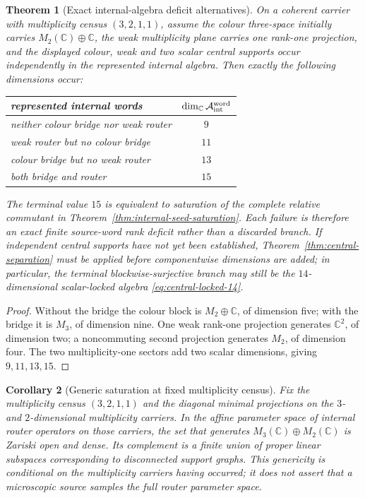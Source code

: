 \documentclass[11pt]{article}
\newtheorem{theorem}{Theorem}[section]
\newtheorem{corollary}[theorem]{Corollary}
\theoremstyle{definition}
\theoremstyle{remark}
\newcommand{\C}{\mathbb C}
\newcommand{\A}{\mathcal A}
\begin{document}
\begin{theorem}[Exact internal-algebra deficit alternatives]
\label{thm:internal-deficit-alternatives}
On a coherent carrier with multiplicity census $(3,2,1,1)$, assume the colour
three-space initially carries $M_2(\C)\oplus\C$, the weak multiplicity plane
carries one rank-one projection, and the displayed colour, weak and two scalar
central supports occur independently in the represented internal algebra.
Then exactly the following dimensions occur:
\begin{center}
\begin{tabular}{L{0.47\textwidth}c}
\toprule
represented internal words & $\dim_\C\A_{\rm int}^{\rm word}$\\\midrule
neither colour bridge nor weak router & $9$\\
weak router but no colour bridge & $11$\\
colour bridge but no weak router & $13$\\
both bridge and router & $15$\\
\bottomrule
\end{tabular}
\end{center}
The terminal value $15$ is equivalent to saturation of the complete relative
commutant in Theorem~\ref{thm:internal-seed-saturation}.  Each failure is
therefore an exact finite source-word rank deficit rather than a discarded
branch.  If independent central supports have not yet been established,
Theorem~\ref{thm:central-separation} must be applied before componentwise
dimensions are added; in particular, the terminal blockwise-surjective branch
may still be the $14$-dimensional scalar-locked algebra
\eqref{eq:central-locked-14}.
\end{theorem}

\begin{proof}
Without the bridge the colour block is $M_2\oplus\C$, of dimension five; with
the bridge it is $M_3$, of dimension nine.  One weak rank-one projection
generates $\C^2$, of dimension two; a noncommuting second projection generates
$M_2$, of dimension four.  The two multiplicity-one sectors add two scalar
dimensions, giving $9,11,13,15$.
\end{proof}

\begin{corollary}[Generic saturation at fixed multiplicity census]
\label{cor:generic-router-saturation}
Fix the multiplicity census $(3,2,1,1)$ and the diagonal minimal projections
on the $3$- and $2$-dimensional multiplicity carriers.  In the affine parameter
space of internal router operators on those carriers, the set that generates
$M_3(\C)\oplus M_2(\C)$ is Zariski open and dense.  Its complement is a
finite union of proper linear subspaces corresponding to disconnected support
graphs.  This genericity is conditional on the multiplicity carriers having
occurred; it does not assert that a microscopic source samples the full router
parameter space.
\end{corollary}
\end{document}
